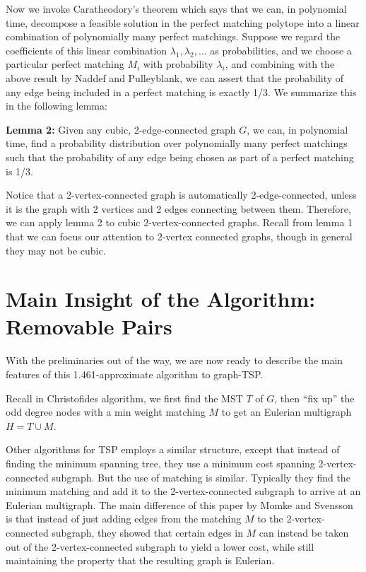 \documentclass[12pt]{article}
\begin{document}
Now we invoke Caratheodory's theorem which says that we can, in polynomial time, decompose a feasible solution in the perfect matching polytope into a linear combination of polynomially many perfect matchings. Suppose we regard the coefficients of this linear combination $\lambda_1, \lambda_2,\ldots$ as probabilities, and we choose a particular perfect matching $M_i$ with probability $\lambda_i$, and combining with the above result by Naddef and Pulleyblank, we can assert that the probability of any edge being included in a perfect matching is exactly 1/3. We summarize this in the following lemma:

{\bf Lemma 2:} Given any cubic, 2-edge-connected graph $G$, we can, in polynomial time, find a probability distribution over polynomially many perfect matchings such that the probability of any edge being chosen as part of a perfect matching is 1/3.

Notice that a 2-vertex-connected graph is automatically 2-edge-connected, unless it is the graph with 2 vertices and 2 edges connecting between them. Therefore, we can apply lemma 2 to cubic 2-vertex-connected graphs. Recall from lemma 1 that we can focus our attention to 2-vertex connected graphs, though in general they may not be cubic.

\section{Main Insight of the Algorithm: Removable Pairs}

With the preliminaries out of the way, we are now ready to describe the main features of this 1.461-approximate algorithm to graph-TSP.

Recall in Christofides algorithm, we first find the MST $T$ of $G$, then ``fix up'' the odd degree nodes with a min weight matching $M$ to get an Eulerian multigraph $H = T\cup M$. 

Other algorithms for TSP employs a similar structure, except that instead of finding the minimum spanning tree, they use a minimum cost spanning 2-vertex-connected subgraph. But the use of matching is similar. Typically they find the minimum matching and add it to the 2-vertex-connected subgraph to arrive at an Eulerian multigraph. The main difference of this paper by Momke and Svensson is that instead of just adding edges from the matching $M$ to the 2-vertex-connected subgraph, they showed that certain edges in $M$ can instead be taken out of the 2-vertex-connected subgraph to yield a lower cost, while still maintaining the property that the resulting graph is Eulerian.
\end{document}

